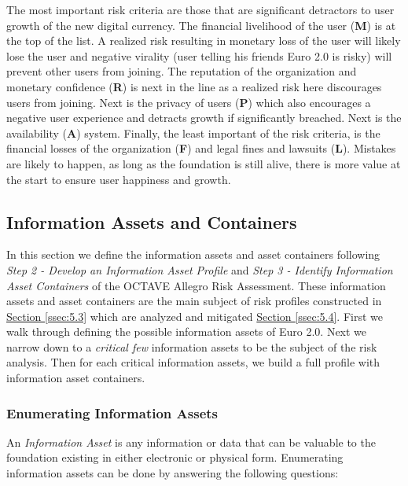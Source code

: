 \documentclass[12pt]{article} %
\newcommand{\hypersectionref}[1]{\hyperref[#1]{Section \ref{#1}}}
\begin{document}
{The most important risk criteria are those that are significant detractors to user growth of the new digital currency. The financial livelihood of the user (\textbf{M}) is at the top of the list. A realized risk resulting in monetary loss of the user will likely lose the user and negative virality (user telling his friends Euro 2.0 is risky) will prevent other users from joining.  The reputation of the organization and monetary confidence (\textbf{R}) is next in the line as a realized risk here discourages users from joining. Next is the privacy of users (\textbf{P}) which also encourages a negative user experience and detracts growth if significantly breached. Next is the availability (\textbf{A}) system. Finally, the least important of the risk criteria, is the financial losses of the organization (\textbf{F}) and legal fines and lawsuits (\textbf{L}). Mistakes are likely to happen, as long as the foundation is still alive, there is more value at the start to ensure user happiness and growth.

\subsection{Information Assets and Containers} \label{ssec:5.2}

In this section we define the information assets and asset containers following \textit{Step 2 - Develop an Information Asset Profile} and \textit{Step 3 - Identify Information Asset Containers} of the OCTAVE Allegro Risk Assessment. These information assets and asset containers are the main subject of risk profiles constructed in \hypersectionref{ssec:5.3} which are analyzed and mitigated \hypersectionref{ssec:5.4}. First we walk through defining the possible information assets of Euro 2.0. Next we narrow down to a \textit{critical few} information assets to be the subject of the risk analysis. Then for each critical information assets, we build a full profile with information asset containers.

\subsubsection{Enumerating Information Assets} \label{sssec:5.2:enumeratingAssets}

An \textit{Information Asset} is any information or data that can be valuable to the foundation existing in either electronic or physical form. Enumerating information assets can be done by answering the following questions\cite{CaralliIntroducingOCTAVE2007}:

}
\end{document}
